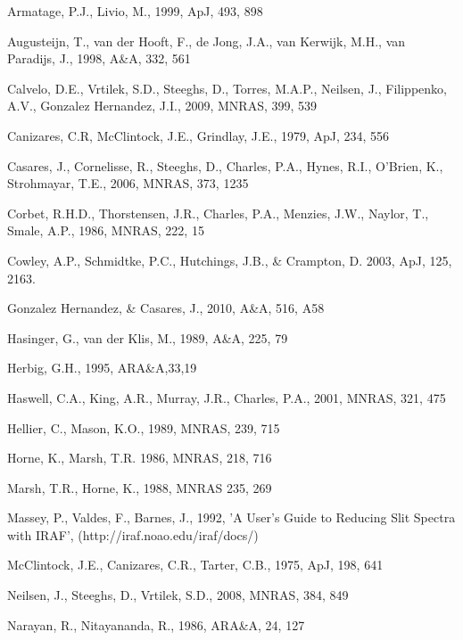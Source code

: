 \documentclass{aa}
\begin{document}
\begin{thebibliography}{}

 Armatage, P.J., Livio, M., 1999, ApJ, 493, 898

 Augusteijn, T., van der Hooft, F., de Jong, J.A., van Kerwijk, M.H., van Paradijs, J., 1998, A\&A, 332, 561

 Calvelo, D.E., Vrtilek, S.D., Steeghs, D., Torres, M.A.P., Neilsen, J., Filippenko, A.V., Gonzalez Hernandez, J.I., 2009, MNRAS, 399, 539

 Canizares, C.R, McClintock, J.E., Grindlay, J.E., 1979, ApJ, 234, 556

Casares, J., Cornelisse, R., Steeghs, D., Charles, P.A., Hynes, R.I.,  O'Brien, K., Strohmayar, T.E., 2006, MNRAS, 373, 1235

 Corbet, R.H.D., Thorstensen, J.R., Charles, P.A., Menzies, J.W., Naylor, T., Smale, A.P., 1986, MNRAS, 222, 15

 Cowley, A.P., Schmidtke, P.C., Hutchings, J.B.,
\& Crampton, D. 2003, ApJ, 125, 2163.

Gonzalez Hernandez, \& Casares, J., 2010, A\&A, 516, A58  

 Hasinger, G., van der Klis, M., 1989, A\&A, 225, 79

\bibitem[[1995]{herbig} Herbig, G.H., 1995, ARA\&A,33,19

 Haswell, C.A., King, A.R., Murray, J.R., Charles, P.A., 2001, 
MNRAS, 321, 475

 Hellier, C., Mason, K.O., 1989, MNRAS, 239, 715

 Horne, K., Marsh, T.R. 1986, MNRAS, 218, 716

 Marsh, T.R., Horne, K., 1988, MNRAS 235, 269

 Massey, P., Valdes, F., Barnes, J., 1992, 'A User's Guide to Reducing Slit Spectra with IRAF', (http://iraf.noao.edu/iraf/docs/)

 McClintock, J.E., Canizares, C.R., Tarter, C.B., 1975, ApJ, 198, 641

 Neilsen, J., Steeghs, D., Vrtilek, S.D., 2008, MNRAS, 384, 849

 Narayan, R., Nitayananda, R., 1986, ARA\&A, 24, 127


\end{thebibliography}
\end{document}
